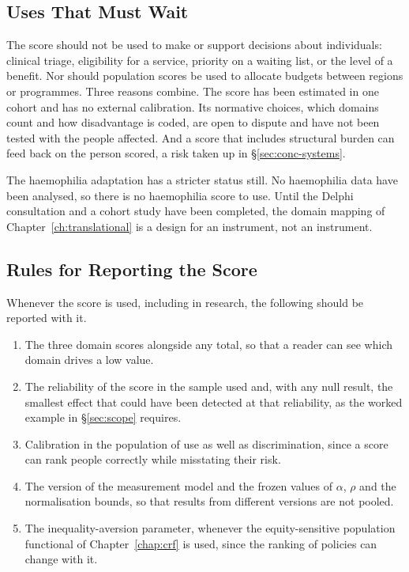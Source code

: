 \subsection{Uses That Must Wait}

The score should not be used to make or support decisions about individuals:
clinical triage, eligibility for a service, priority on a waiting list, or the
level of a benefit. Nor should population scores be used to allocate budgets
between regions or programmes. Three reasons combine. The score has been estimated in one cohort and has no
external calibration. Its normative choices, which domains count and how
disadvantage is coded, are open to dispute and have not been tested with the
people affected. And a score that includes structural burden can feed back on
the person scored, a risk taken up in \S\ref{sec:conc-systems}.

The haemophilia adaptation has a stricter status still. No haemophilia data have
been analysed, so there is no haemophilia score to use. Until the Delphi
consultation and a cohort study have been completed, the domain mapping of
Chapter~\ref{ch:translational} is a design for an instrument, not an instrument.

\subsection{Rules for Reporting the Score}

Whenever the score is used, including in research, the following should be
reported with it.

\begin{enumerate}
  \item The three domain scores alongside any total, so that a reader can see
  which domain drives a low value.
  \item The reliability of the score in the sample used and, with any null
  result, the smallest effect that could have been detected at that
  reliability, as the worked example in \S\ref{sec:scope} requires.
  \item Calibration in the population of use as well as discrimination, since
  a score can rank people correctly while misstating their risk.
  \item The version of the measurement model and the frozen values of $\alpha$,
  $\rho$ and the normalisation bounds, so that results from different versions
  are not pooled.
  \item The inequality-aversion parameter, whenever the equity-sensitive
  population functional of Chapter~\ref{chap:crf} is used, since the ranking of
  policies can change with it.
\end{enumerate}

